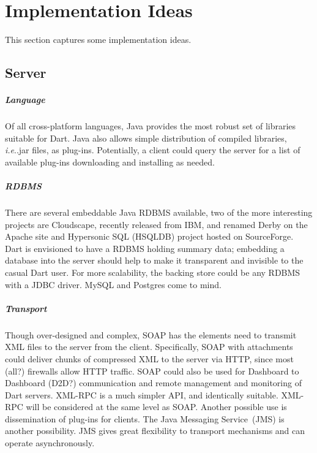 \documentclass{InsightBook}
\makeatletter
\DeclareRobustCommand\onedot{\futurelet\@let@token\@onedot}
\def\@onedot{\ifx\@let@token.\else.\xspace\fi}
\def\ie{\emph{i.e}\onedot} \def\Ie{\emph{I.e}\onedot}
\makeatother
\begin{document}
\chapter{Implementation Ideas}
This section captures some implementation ideas.
\section{Server}

\paragraph{Language}
Of all cross-platform languages, Java provides the most robust set of libraries suitable for
Dart.  Java also allows simple distribution of compiled libraries,
\ie jar files, as plug-ins.  Potentially, a client could query
the server for a list of available plug-ins downloading and installing
as needed.

\paragraph{RDBMS}
There are several embeddable Java RDBMS available,
two of the more interesting projects are Cloudscape, recently released
from IBM, and renamed Derby on the Apache site and Hypersonic SQL
(HSQLDB) project hosted on SourceForge.  Dart is envisioned to have a
RDBMS holding summary data; embedding a database into the server
should help to make it transparent and invisible to the casual Dart
user.  For more scalability, the backing store could be any
RDBMS with a JDBC driver.  MySQL and Postgres come to mind.

\paragraph{Transport} 
Though over-designed and complex, SOAP has the elements need to
transmit XML files to the server from the client.  Specifically, SOAP
with attachments could deliver chunks of compressed XML to the server
via HTTP, since most (all?) firewalls allow HTTP traffic. SOAP could
also be used for Dashboard to Dashboard (D2D?)  communication and
remote management and monitoring of Dart servers.  XML-RPC is a much
simpler API, and identically suitable.  XML-RPC will be considered at
the same level as SOAP. Another possible use is dissemination of
plug-ins for clients.  The Java Messaging Service~(JMS) is another
possibility.  JMS gives great flexibility to transport mechanisms and
can operate asynchronously.
\end{document}

